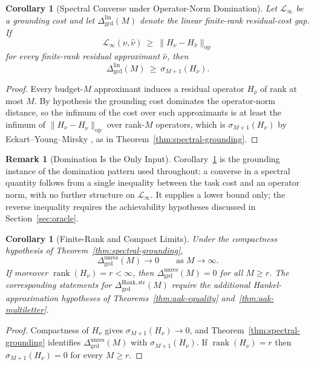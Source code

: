 \documentclass[12pt]{article}
\newtheorem{corollary}[theorem]{Corollary}
\theoremstyle{definition}
\newtheorem{remark}[theorem]{Remark}
\newcommand{\GrdLin}{\Delta_{\mathrm{grd}}^{\mathrm{lin}}}
\newcommand{\Dunres}{\Delta_{\mathrm{grd}}^{\mathrm{unres}}}
\newcommand{\DHankstr}{\Delta_{\mathrm{grd}}^{\mathrm{Hank,str}}}
\begin{document}
\begin{corollary}[Spectral Converse under Operator-Norm Domination]
\label{cor:grounding-domination}
Let $\mathcal L_\infty$ be a grounding cost and let $\GrdLin(M)$ denote the
linear finite-rank residual-cost gap.  If
\[
\mathcal L_\infty(\nu,\widehat\nu)
\ \ge\
\|H_\nu-H_{\widehat\nu}\|_{\mathrm{op}}
\]
for every finite-rank residual approximant $\widehat\nu$, then
\[
\GrdLin(M)\ \ge\ \sigma_{M+1}(H_\nu).
\]
\end{corollary}

\begin{proof}
Every budget-$M$ approximant induces a residual operator $H_{\widehat\nu}$ of
rank at most $M$.  By hypothesis the grounding cost dominates the operator-norm
distance, so the infimum of the cost over such approximants is at least the
infimum of $\|H_\nu-H_{\widehat\nu}\|_{\mathrm{op}}$ over rank-$M$ operators,
which is $\sigma_{M+1}(H_\nu)$ by Eckart--Young--Mirsky
\cite{eckart1936,mirsky1960}, as in Theorem~\ref{thm:spectral-grounding}.
\end{proof}

\begin{remark}[Domination Is the Only Input]
\label{rem:grounding-domination-scope}
Corollary~\ref{cor:grounding-domination} is the grounding instance of the
domination pattern used throughout: a converse in a spectral quantity follows
from a single inequality between the task cost and an operator norm, with no
further structure on $\mathcal L_\infty$.  It supplies a lower bound only; the
reverse inequality requires the achievability hypotheses discussed in
Section~\ref{sec:oracle}.
\end{remark}

\begin{corollary}[Finite-Rank and Compact Limits]
\label{cor:grounding-finite-rank}
Under the compactness hypothesis of Theorem~\ref{thm:spectral-grounding},
\[
\Dunres(M)\longrightarrow0
\qquad\text{as }M\to\infty .
\]
If moreover $\operatorname{rank}(H_\nu)=r<\infty$, then $\Dunres(M)=0$ for all
$M\ge r$.  The corresponding statements for $\DHankstr(M)$ require the
additional Hankel-approximation hypotheses of
Theorems~\ref{thm:aak-equality} and~\ref{thm:aak-multiletter}.
\end{corollary}

\begin{proof}
Compactness of $H_\nu$ gives $\sigma_{M+1}(H_\nu)\to0$, and
Theorem~\ref{thm:spectral-grounding} identifies $\Dunres(M)$ with
$\sigma_{M+1}(H_\nu)$.  If $\operatorname{rank}(H_\nu)=r$ then
$\sigma_{M+1}(H_\nu)=0$ for every $M\ge r$.
\end{proof}
\end{document}

